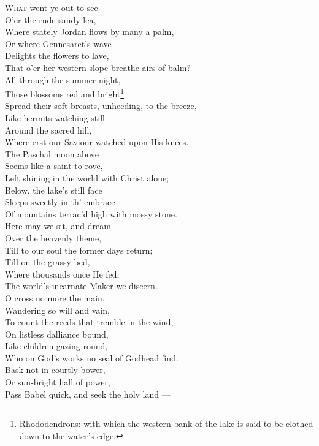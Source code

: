 \textsc{What} went ye out to see \\
 O’er the rude sandy lea, \\
 Where stately Jordan flows by many a palm, \\
 Or where Gennesaret’s wave \\
 Delights the flowers to lave, \\
 That o’er her western slope breathe airs of balm? \\
  All through the summer night, \\
 Those blossoms red and bright\footnote{Rhododendrons: with which the western bank of the lake is said to be clothed down to the water’s edge.} \\
 Spread their soft breasts, unheeding, to the breeze, \\
 Like hermits watching still \\
 Around the sacred hill, \\
 Where erst our Saviour watched upon His knees. \\
  The Paschal moon above \\
 Seems like a saint to rove, \\
 Left shining in the world with Christ alone; \\
 Below, the lake’s still face \\
 Sleeps sweetly in th’ embrace \\
 Of mountains terrac’d high with mossy stone. \\
  Here may we sit, and dream \\
 Over the heavenly theme, \\
 Till to our soul the former days return; \\
 Till on the grassy bed, \\
 Where thousands once He fed, \\
 The world’s incarnate Maker we discern. \\
  O cross no more the main, \\
 Wandering so will and vain, \\
 To count the reeds that tremble in the wind, \\
 On listless dalliance bound, \\
 Like children gazing round, \\
 Who on God’s works no seal of Godhead find. \\
  Bask not in courtly bower, \\
 Or sun-bright hall of power, \\
 Pass Babel quick, and seek the holy land — \\
